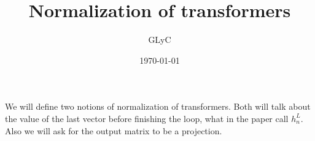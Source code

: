 \documentclass{article}
\title{Normalization of transformers}
\author{GLyC}
\date{\today}
\begin{document}
\maketitle

We will define two notions of normalization of transformers. Both will talk about the value of the last vector before finishing the loop, what in the paper call $h_n^L$. Also we will ask for the output matrix to be a projection.






\end{document}
